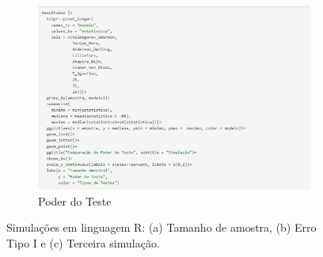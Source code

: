 \documentclass[final]{beamer}
\begin{document}
\begin{frame}[t]
\begin{columns}[t,totalwidth=0.6\paperwidth]
\begin{column}{0.45\textwidth}
\begin{figure}[H]
\begin{subfigure}[b]{0.33\linewidth}
        \centering
        \includegraphics[width=\linewidth]{fig3_simulacao.jpg}
        \caption{Poder do Teste}
        \label{fig:simulacao3}
    \end{subfigure}

    \caption{Simulações em linguagem R: (a) Tamanho de amostra, (b) Erro Tipo I e (c) Terceira simulação.}
    \label{fig:simulacoes}
\end{figure}



\end{column}
\end{columns}
\end{frame}
\end{document}
